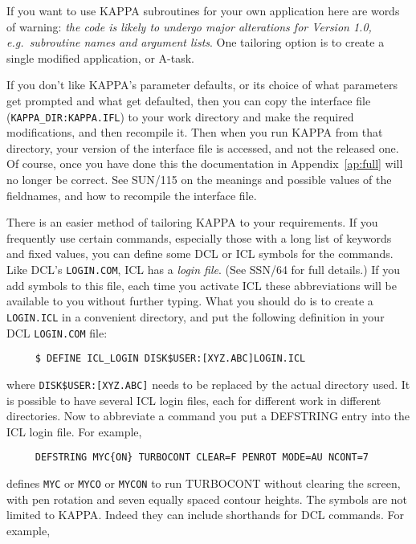 {If you want to use {\small KAPPA} subroutines for your own application
here are words of warning: {\em the code is likely to undergo major
alterations for Version 1.0, {\em e.g.}\ subroutine names and argument
lists}.  One tailoring option is to create a single modified
application, or A-task.

If you don't like {\small KAPPA}'s parameter defaults, or its choice of
what parameters get prompted and what get defaulted, then you can copy
the interface file ({\tt KAPPA\_DIR:KAPPA.IFL}) to your work directory
and make the required modifications, and then recompile it.  Then when
you run {\small KAPPA} from that directory, your version of the
interface file is accessed, and not the released one.  Of course, once
you have done this the documentation in Appendix~\ref{ap:full} will no
longer be correct.  See SUN/115 on the meanings and possible values of
the fieldnames, and how to recompile the interface file. 

There is an easier method of tailoring {\small KAPPA} to your
requirements. If you frequently use certain commands, especially those
with a long list of keywords and fixed values, you can define some
{\small DCL} or {\small ICL} symbols for the commands.  Like {\small
DCL}'s {\tt LOGIN.COM}, {\small ICL} has a {\em login file}. (See SSN/64
for full details.)  If you add symbols to this file, each time you
activate {\small ICL} these abbreviations will be available to you
without further typing. What you should do is to create a {\tt
LOGIN.ICL} in a convenient directory, and put the following definition
in your {\small DCL} {\tt LOGIN.COM} file: 

\small
\begin{verbatim}
     $ DEFINE ICL_LOGIN DISK$USER:[XYZ.ABC]LOGIN.ICL
\end{verbatim}
\normalsize
where {\tt DISK\$USER:[XYZ.ABC]} needs to be replaced by the actual
directory used.  It is possible to have several {\small ICL} login
files, each for different work in different directories.  Now to
abbreviate a command you put a DEFSTRING entry into the {\small ICL}
login file. For example,

\small
\begin{verbatim}
     DEFSTRING MYC{ON} TURBOCONT CLEAR=F PENROT MODE=AU NCONT=7
\end{verbatim}
\normalsize
defines {\tt MYC} or {\tt MYCO} or {\tt MYCON} to run TURBOCONT without
clearing the screen, with pen rotation and seven equally spaced contour heights.
The symbols are not limited to {\small KAPPA}.  Indeed they can include
shorthands for {\small DCL} commands.  For example,

}
